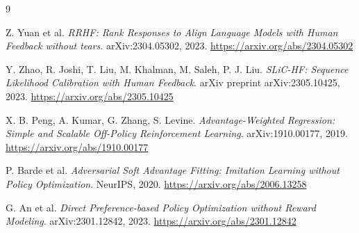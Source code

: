 \documentclass[11pt,a4paper]{article}
\theoremstyle{remark}
\begin{document}
\begin{thebibliography}{9}

Z. Yuan et al.
\textit{RRHF: Rank Responses to Align Language Models
with Human Feedback without tears}.
arXiv:2304.05302, 2023.
\url{https://arxiv.org/abs/2304.05302}

Y. Zhao, R. Joshi, T. Liu, M. Khalman, M. Saleh, P. J. Liu.
\textit{SLiC-HF: Sequence Likelihood Calibration
with Human Feedback}.
arXiv preprint arXiv:2305.10425, 2023.
\url{https://arxiv.org/abs/2305.10425}

X. B. Peng, A. Kumar, G. Zhang, S. Levine.
\textit{Advantage-Weighted Regression:
Simple and Scalable Off-Policy Reinforcement Learning}.
arXiv:1910.00177, 2019.
\url{https://arxiv.org/abs/1910.00177}

P. Barde et al.
\textit{Adversarial Soft Advantage Fitting:
Imitation Learning without Policy Optimization}.
NeurIPS, 2020.
\url{https://arxiv.org/abs/2006.13258}

G. An et al.
\textit{Direct Preference-based Policy Optimization
without Reward Modeling}.
arXiv:2301.12842, 2023.
\url{https://arxiv.org/abs/2301.12842}

\end{thebibliography}
\end{document}
